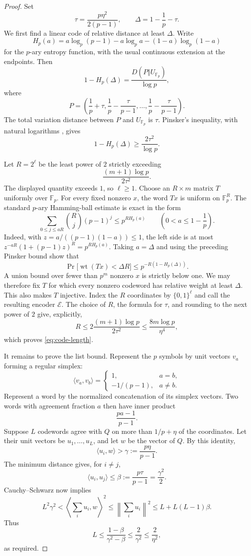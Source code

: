 \documentclass[11pt]{article}
\numberwithin{equation}{section}
\theoremstyle{definition}
\theoremstyle{remark}
\newcommand{\F}{\mathbb F}
\begin{document}
\begin{proof}
Set
\[
 \tau=\frac{p\eta^2}{2(p-1)},
 \qquad \Delta=1-\frac1p-\tau.
\]
We first find a linear code of relative distance at least $\Delta$.  Write
\[
 H_p(a)=a\log_p(p-1)-a\log_p a-(1-a)\log_p(1-a)
\]
for the $p$-ary entropy function, with the usual continuous extension at
the endpoints.  Then
\[
 1-H_p(\Delta)=\frac{D(P\Vert U_{\F_p})}{\log p},
\]
where
\[
 P=\left(\frac1p+\tau,
 \frac1p-\frac{\tau}{p-1},\ldots,
 \frac1p-\frac{\tau}{p-1}\right).
\]
The total variation distance between $P$ and $U_{\F_p}$ is $\tau$.  Pinsker's
inequality, with natural logarithms \cite{CoverThomas2006}, gives
\[
 1-H_p(\Delta)\ge\frac{2\tau^2}{\log p}.
\]

Let $R=2^\ell$ be the least power of $2$ strictly exceeding
\[
 \frac{(m+1)\log p}{2\tau^2}.
\]
The displayed quantity exceeds $1$, so $\ell\ge1$.
Choose an $R\times m$ matrix $T$ uniformly over $\F_p$.  For every fixed
nonzero $x$, the word $Tx$ is uniform on $\F_p^R$.  The standard $p$-ary
Hamming-ball estimate \cite{CoverThomas2006} is exact in the form
\[
 \sum_{0\le j\le aR}\binom Rj(p-1)^j\le p^{RH_p(a)}
 \qquad\left(0<a\le1-\frac1p\right).
\]
Indeed, with $z=a/((p-1)(1-a))\le1$, the left side is at most
$z^{-aR}(1+(p-1)z)^R=p^{RH_p(a)}$.  Taking $a=\Delta$ and using
the preceding Pinsker bound show that
\[
 \Pr\bigl[\operatorname{wt}(Tx)<\Delta R\bigr]
 \le p^{-R(1-H_p(\Delta))}.
\]
A union bound over fewer than $p^m$ nonzero $x$ is strictly below one.
We may therefore fix $T$ for which every nonzero codeword has relative
weight at least $\Delta$.  This also makes $T$ injective.  Index the $R$
coordinates by $\{0,1\}^\ell$ and call the resulting encoder $\mathcal E$.
The choice of $R$, the formula for $\tau$, and rounding to the next power
of $2$ give, explicitly,
\[
 R\le 2\frac{(m+1)\log p}{2\tau^2}
 \le\frac{8m\log p}{\eta^4},
\]
which proves \eqref{eq:code-length}.

It remains to prove the list bound.  Represent the $p$ symbols by unit
vectors $v_a$ forming a regular simplex:
\[
 \langle v_a,v_b\rangle=
 \begin{cases}
 1,&a=b,\\
 -1/(p-1),&a\ne b.
 \end{cases}
\]
Represent a word by the normalized concatenation of its simplex vectors.
Two words with agreement fraction $a$ then have inner product
\[
 \frac{pa-1}{p-1}.
\]
Suppose $L$ codewords agree with $Q$ on more than $1/p+\eta$ of the
coordinates.  Let their unit vectors be $u_1,\ldots,u_L$, and let $w$ be
the vector of $Q$.  By this identity,
\[
 \langle u_i,w\rangle>\gamma:=\frac{p\eta}{p-1}.
\]
The minimum distance gives, for $i\ne j$,
\[
 \langle u_i,u_j\rangle\le
 \beta:=\frac{p\tau}{p-1}=\frac{\gamma^2}{2}.
\]
Cauchy--Schwarz now implies
\[
 L^2\gamma^2
 <\left\langle\sum_i u_i,w\right\rangle^2
 \le\left\|\sum_i u_i\right\|^2
 \le L+L(L-1)\beta.
\]
Thus
\[
 L\le\frac{1-\beta}{\gamma^2-\beta}
 \le\frac2{\gamma^2}\le\frac2{\eta^2},
\]
as required.
\end{proof}
\end{document}
